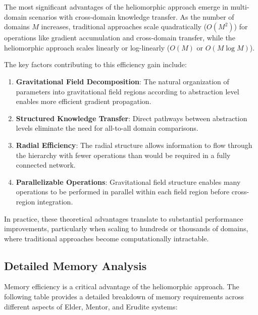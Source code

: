 The most significant advantages of the heliomorphic approach emerge in multi-domain scenarios with cross-domain knowledge transfer. As the number of domains $M$ increases, traditional approaches scale quadratically ($O(M^2)$) for operations like gradient accumulation and cross-domain transfer, while the heliomorphic approach scales linearly or log-linearly ($O(M)$ or $O(M \log M)$).

The key factors contributing to this efficiency gain include:

\begin{enumerate}
    \item \textbf{Gravitational Field Decomposition}: The natural organization of parameters into gravitational field regions according to abstraction level enables more efficient gradient propagation.
    
    \item \textbf{Structured Knowledge Transfer}: Direct pathways between abstraction levels eliminate the need for all-to-all domain comparisons.
    
    \item \textbf{Radial Efficiency}: The radial structure allows information to flow through the hierarchy with fewer operations than would be required in a fully connected network.
    
    \item \textbf{Parallelizable Operations}: Gravitational field structure enables many operations to be performed in parallel within each field region before cross-region integration.
\end{enumerate}

In practice, these theoretical advantages translate to substantial performance improvements, particularly when scaling to hundreds or thousands of domains, where traditional approaches become computationally intractable.

\subsection{Detailed Memory Analysis}

Memory efficiency is a critical advantage of the heliomorphic approach. The following table provides a detailed breakdown of memory requirements across different aspects of Elder, Mentor, and Erudite systems:

